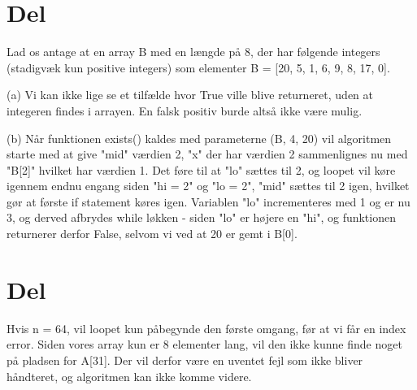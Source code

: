 \documentclass{article}
\begin{document}
\section{Del}

Lad os antage at en array B med en længde på 8, der har følgende integers (stadigvæk kun positive integers) som elementer B = [20, 5, 1, 6, 9, 8, 17, 0]. \newline

(a) Vi kan ikke lige se et tilfælde hvor True ville blive returneret, uden at integeren findes i arrayen. En falsk positiv burde altså ikke være mulig.\newline

(b) Når funktionen exists() kaldes med parameterne (B, 4, 20) vil algoritmen starte med at give "mid" værdien 2, "x" der har værdien 2 sammenlignes nu med "B[2]" hvilket har værdien 1. Det føre til at "lo" sættes til 2, og loopet vil køre igennem endnu engang siden "hi = 2" og "lo = 2", "mid" sættes til 2 igen, hvilket gør at første if statement køres igen. Variablen "lo" incrementeres med 1 og er nu 3, og derved afbrydes while løkken - siden "lo" er højere en "hi", og funktionen returnerer derfor False, selvom vi ved at 20 er gemt i B[0].

\section{Del}

Hvis n = 64, vil loopet kun påbegynde den første omgang, før at vi får en index error. Siden vores array kun er 8 elementer lang, vil den ikke kunne finde noget på pladsen for A[31]. Der vil derfor være en uventet fejl som ikke bliver håndteret, og algoritmen kan ikke komme videre. 
\end{document}

